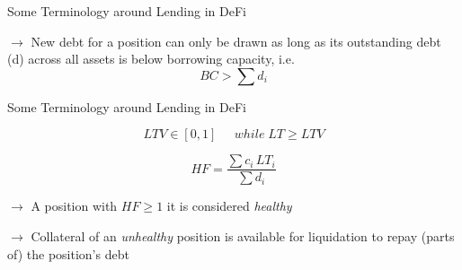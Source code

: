 \documentclass[handout]{beamer}
\begin{document}
\begin{frame}{Some Terminology around Lending in DeFi}

\vspace{1em}


	
		
$	\rightarrow$ New debt for a position can only be drawn as long as its outstanding debt (d) across all assets is below borrowing capacity, i.e. 
\begin{equation}
	  BC > \sum d_i\label{eq:BC_restriction} 
	\end{equation}

	\vspace{1em}

\end{frame}

\begin{frame}{Some Terminology around Lending in DeFi}

\vspace{1em}

	
	 {\begin{equation}
	  LTV \in [0,1] \; \;\;\;\; while \; LT \geq LTV   \label{eq:LT} 
	\end{equation}}
	



\begin{equation}
	  HF = \frac{\sum c_i \, LT_i}{\sum d_i} \label{eq:HF} 
\end{equation}

	\vspace{1em}

 $	\rightarrow$ A position with $HF \geq 1$ it is considered \textit{healthy}
 
 \vspace{1em}

 $	\rightarrow$ Collateral of an \textit{unhealthy} position is available for liquidation to repay (parts of) the position’s debt  


\end{frame}
\end{document}
